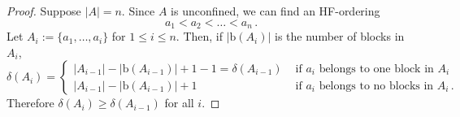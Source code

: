 \documentclass[10pt,a4paper]{article}
\theoremstyle{note}
\begin{document}
\begin{proof} 
Suppose $|A|=n$. Since $A$ is unconfined, we can find an HF-ordering %
\[a_1 < a_2 < \ldots < a_n \, .\]
Let $A_i:= \{a_1, \ldots, a_i \}$ for $1 \leq i \leq n$. Then, if  $|\mathrm{b}(A_i)|$ is the number of blocks in $A_i$,
$$ \delta(A_i)= \begin{cases} |A_{i-1}|- |\mathrm{b}(A_{i-1})| +1 -1 = \delta(A_{i-1}) & \mbox{ if $a_i$ belongs to one block in } A_i \\
|A_{i-1}|- |\mathrm{b}(A_{i-1})| +1 & \mbox{ if $a_i$ belongs to no blocks in } A_i \, .\end{cases} $$
Therefore $\delta(A_i) \geq \delta(A_{i-1})$ for all $i$. 
\end{proof}
\end{document}
